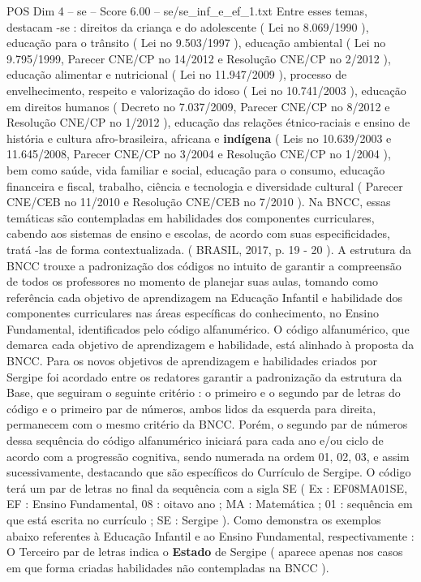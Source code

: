 \begin{textsample}{POS Dim 4 – se – Score 6.00 – se/se\_inf\_e\_ef\_1.txt}
Entre esses temas, destacam -se : direitos da criança e do adolescente ( Lei no 8.069/1990 ), educação para o trânsito ( Lei no 9.503/1997 ), educação ambiental ( Lei no 9.795/1999, Parecer CNE/CP no 14/2012 e Resolução CNE/CP no 2/2012 ), educação alimentar e nutricional ( Lei no 11.947/2009 ), processo de envelhecimento, respeito e valorização do idoso ( Lei no 10.741/2003 ), educação em direitos humanos ( Decreto no 7.037/2009, Parecer CNE/CP no 8/2012 e Resolução CNE/CP no 1/2012 ), educação das relações étnico-raciais e ensino de história e cultura afro-brasileira, africana e \textbf{indígena} ( Leis no 10.639/2003 e 11.645/2008, Parecer CNE/CP no 3/2004 e Resolução CNE/CP no 1/2004 ), bem como saúde, vida familiar e social, educação para o consumo, educação financeira e fiscal, trabalho, ciência e tecnologia e diversidade cultural ( Parecer CNE/CEB no 11/2010 e Resolução CNE/CEB no 7/2010 ).
Na BNCC, essas temáticas são contempladas em habilidades dos componentes curriculares, cabendo aos sistemas de ensino e escolas, de acordo com suas especificidades, tratá -las de forma contextualizada. ( BRASIL, 2017, p. 19 - 20 ).
A estrutura da BNCC trouxe a padronização dos códigos no intuito de garantir a compreensão de todos os professores no momento de planejar suas aulas, tomando como referência cada objetivo de aprendizagem na Educação Infantil e habilidade dos componentes curriculares nas áreas específicas do conhecimento, no Ensino Fundamental, identificados pelo código alfanumérico.
O código alfanumérico, que demarca cada objetivo de aprendizagem e habilidade, está alinhado à proposta da BNCC.
Para os novos objetivos de aprendizagem e habilidades criados por Sergipe foi acordado entre os redatores garantir a padronização da estrutura da Base, que seguiram o seguinte critério : o primeiro e o segundo par de letras do código e o primeiro par de números, ambos lidos da esquerda para direita, permanecem com o mesmo critério da BNCC.
Porém, o segundo par de números dessa sequência do código alfanumérico iniciará para cada ano e/ou ciclo de acordo com a progressão cognitiva, sendo numerada na ordem 01, 02, 03, e assim sucessivamente, destacando que são específicos do Currículo de Sergipe.
O código terá um par de letras no final da sequência com a sigla SE ( Ex : EF08MA01SE, EF : Ensino Fundamental, 08 : oitavo ano ; MA : Matemática ; 01 : sequência em que está escrita no currículo ; SE : Sergipe ).
Como demonstra os exemplos abaixo referentes à Educação Infantil e ao Ensino Fundamental, respectivamente : O Terceiro par de letras indica o \textbf{Estado} de Sergipe ( aparece apenas nos casos em que forma criadas habilidades não contempladas na BNCC ).

\end{textsample}
